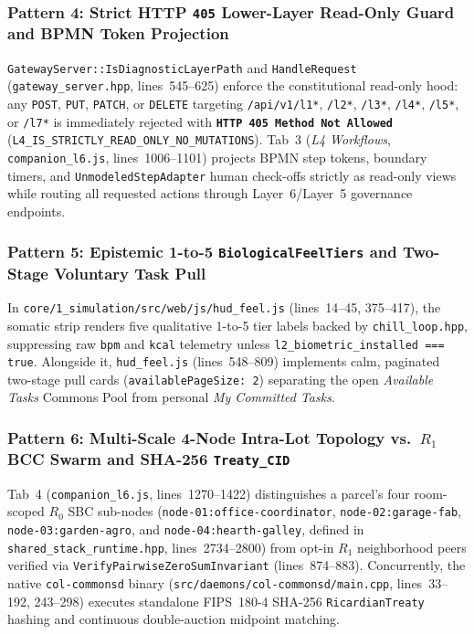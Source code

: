 \subsubsection{Pattern 4: Strict HTTP \texttt{405} Lower-Layer Read-Only Guard and BPMN Token Projection}
\texttt{GatewayServer::IsDiagnosticLayerPath} and \texttt{HandleRequest} (\texttt{gateway\_server.hpp}, lines~545--625) enforce the constitutional read-only hood: any \texttt{POST}, \texttt{PUT}, \texttt{PATCH}, or \texttt{DELETE} targeting \texttt{/api/v1/l1*}, \texttt{/l2*}, \texttt{/l3*}, \texttt{/l4*}, \texttt{/l5*}, or \texttt{/l7*} is immediately rejected with \textbf{\texttt{HTTP 405 Method Not Allowed}} (\texttt{L4\_IS\_STRICTLY\_READ\_ONLY\_NO\_MUTATIONS}). Tab~3 (\textit{L4 Workflows}, \texttt{companion\_l6.js}, lines~1006--1101) projects BPMN step tokens, boundary timers, and \texttt{UnmodeledStepAdapter} human check-offs strictly as read-only views while routing all requested actions through Layer~6/Layer~5 governance endpoints.

\subsubsection{Pattern 5: Epistemic 1-to-5 \texttt{BiologicalFeelTiers} and Two-Stage Voluntary Task Pull}
In \texttt{core/1\_simulation/src/web/js/hud\_feel.js} (lines~14--45, 375--417), the somatic strip renders five qualitative 1-to-5 tier labels backed by \texttt{chill\_loop.hpp}, suppressing raw \texttt{bpm} and \texttt{kcal} telemetry unless \texttt{l2\_biometric\_installed === true}. Alongside it, \texttt{hud\_feel.js} (lines~548--809) implements calm, paginated two-stage pull cards (\texttt{availablePageSize: 2}) separating the open \textit{Available Tasks} Commons Pool from personal \textit{My Committed Tasks}.

\subsubsection{Pattern 6: Multi-Scale 4-Node Intra-Lot Topology vs.\ $R_1$ BCC Swarm and SHA-256 \texttt{Treaty\_CID}}
Tab~4 (\texttt{companion\_l6.js}, lines~1270--1422) distinguishes a parcel's four room-scoped $R_0$ SBC sub-nodes (\texttt{node-01:office-coordinator}, \texttt{node-02:garage-fab}, \texttt{node-03:garden-agro}, and \texttt{node-04:hearth-galley}, defined in \texttt{shared\_stack\_runtime.hpp}, lines~2734--2800) from opt-in $R_1$ neighborhood peers verified via \texttt{VerifyPairwiseZeroSumInvariant} (lines~874--883). Concurrently, the native \texttt{col-commonsd} binary (\texttt{src/daemons/col-commonsd/main.cpp}, lines~33--192, 243--298) executes standalone FIPS~180-4 SHA-256 \texttt{RicardianTreaty} hashing and continuous double-auction midpoint matching.

